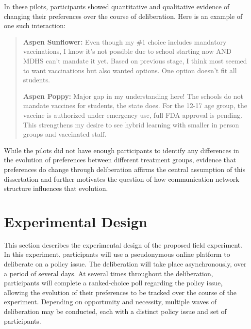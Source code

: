 In these pilots, participants showed quantitative and qualitative evidence of
changing their preferences over the course of deliberation.
Here is an example of one such interaction:
\begin{quote}
{\bfseries Aspen Sunflower:} Even though my \#1 choice includes mandatory vaccinations, I know it's not possible due to school starting now AND MDHS can't mandate it yet. Based on previous stage, I think most seemed to want vaccinations but also wanted options. One option doesn't fit all students.

{\bfseries Aspen Poppy:} Major gap in my understanding here! The schools do not mandate vaccines for students, the state does. For the 12-17 age group, the vaccine is authorized under emergency use, full FDA approval is pending. This strengthens my desire to see hybrid learning with smaller in person groups and vaccinated staff.
\end{quote}

While the pilots did not have enough participants to identify any differences
in the evolution of preferences between different treatment groups,
evidence that preferences do change through deliberation affirms the central
assumption of this dissertation and further motivates the question of how
communication network structure influences that evolution.

\section{Experimental Design}

This section describes the experimental design of the proposed field experiment.
In this experiment, participants will use a pseudonymous online platform
to deliberate on a policy issue.
The deliberation will take place asynchronously, over a period of several days.
At several times throughout the deliberation,
participants will complete a ranked-choice poll regarding the policy issue,
allowing the evolution of their preferences to be tracked over the course of the
experiment.
Depending on opportunity and necessity, multiple waves of deliberation may
be conducted, each with a distinct policy issue and set of participants.


